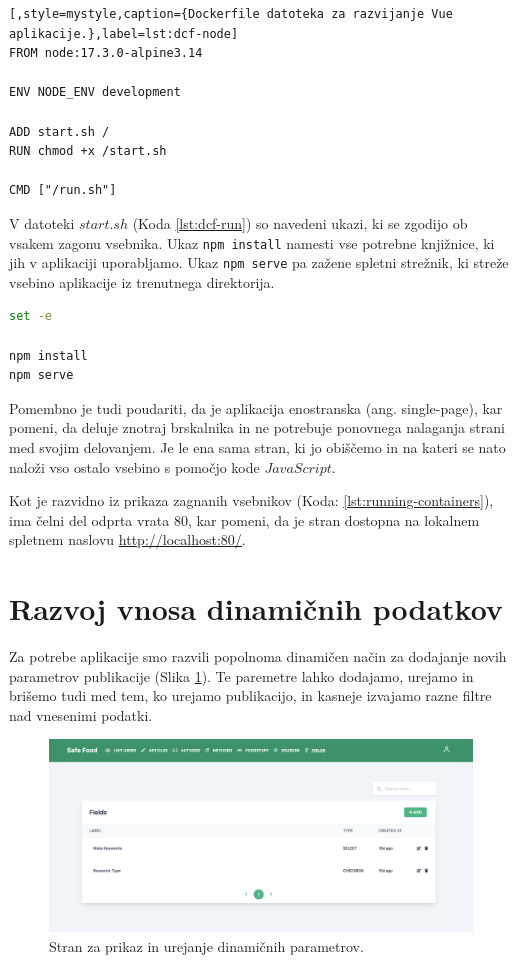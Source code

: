 \begin{lstlisting}[,style=mystyle,caption={Dockerfile datoteka za razvijanje Vue aplikacije.},label=lst:dcf-node]
FROM node:17.3.0-alpine3.14

ENV NODE_ENV development

ADD start.sh /
RUN chmod +x /start.sh

CMD ["/run.sh"]
\end{lstlisting}

V datoteki $start.sh$ (Koda \ref{lst:dcf-run}) so navedeni ukazi, ki se zgodijo ob vsakem zagonu vsebnika. Ukaz \texttt{npm install} namesti vse potrebne knjižnice, ki jih v aplikaciji uporabljamo. Ukaz \texttt{npm serve} pa zažene spletni strežnik, ki streže vsebino aplikacije iz trenutnega direktorija.

\begin{lstlisting}[language=bash,style=mystyle,caption={Ukazna datoteka, ki naloži potrebne knjižnice in streže aplikacijo.},label=lst:dcf-run]
set -e

npm install
npm serve
\end{lstlisting}

Pomembno je tudi poudariti, da je aplikacija enostranska (ang. single-page), kar pomeni, da deluje znotraj brskalnika in ne potrebuje ponovnega nalaganja strani med svojim delovanjem. Je le ena sama stran, ki jo obiščemo in na kateri se nato naloži vso ostalo vsebino s pomočjo kode $JavaScript$.

Kot je razvidno iz prikaza zagnanih vsebnikov (Koda: \ref{lst:running-containers}), ima čelni del odprta vrata 80, kar pomeni, da je stran dostopna na lokalnem spletnem naslovu \url{http://localhost:80/}. 

\section{Razvoj vnosa dinamičnih podatkov}
Za potrebe aplikacije smo razvili popolnoma dinamičen način za dodajanje novih parametrov publikacije (Slika \ref{fields-list}). Te paremetre lahko dodajamo, urejamo in brišemo tudi med tem, ko urejamo publikacijo, in kasneje izvajamo razne filtre nad vnesenimi podatki.

\begin{figure}[h]
\begin{center}
\includegraphics[width=1\textwidth]{slike/fields-list.png}
\end{center}
\caption{ Stran za prikaz in urejanje dinamičnih parametrov. }
\label{fields-list}
\end{figure}

